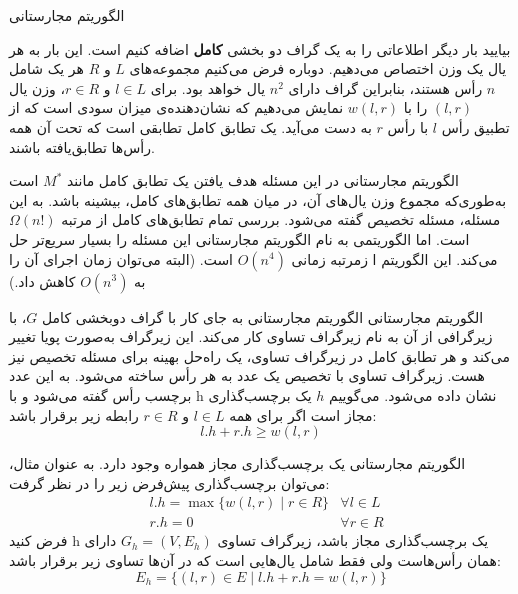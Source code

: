 \begin{itemframe}{الگوریتم مجارستانی}
\itm

بیایید بار دیگر اطلاعاتی را به یک گراف دو بخشی \textbf{کامل} اضافه کنیم است.
این بار به هر یال یک وزن اختصاص می‌دهیم.
دوباره فرض می‌کنیم مجموعه‌های $L$ و $R$ هر یک شامل $n$ رأس هستند، بنابراین گراف دارای
$n^2$
یال خواهد بود.
\itm
برای $l \in L$ و $r \in R$، وزن یال $(l, r)$ را با $w(l, r)$ نمایش می‌دهیم که نشان‌دهنده‌ی میزان سودی است که از تطبیق رأس $l$ با رأس $r$ به دست می‌آید.
\itm
یک تطابق کامل
 تطابقی است که تحت آن همه رأس‌ها تطابق‌یافته باشند.

\end{itemframe}


\begin{itemframe}{الگوریتم مجارستانی}
\itm
در این مسئله هدف یافتن یک تطابق کامل مانند
$M^*$
 است به‌طوری‌که مجموع وزن یال‌های آن، در میان همه تطابق‌های کامل، بیشینه باشد.
به این مسئله،‌ مسئله تخصیص
 گفته می‌شود.
\itm
بررسی تمام تطابق‌های کامل از مرتبه
$ \Omega (n!)$
است. اما الگوریتمی به نام الگوریتم مجارستانی
 این مسئله را بسیار سریع‌تر حل می‌کند.
\itm
این الگوریتم ا زمرتبه زمانی
$O(n^4)$
 است.
(البته می‌توان زمان اجرای آن را به
$O(n^3)$
 کاهش داد.)
\end{itemframe}


\begin{itemframe}{الگوریتم مجارستانی}
\itm
الگوریتم مجارستانی به جای کار با گراف دوبخشی کامل $G$، با زیرگرافی از آن به نام زیرگراف تساوی
کار می‌کند.
این زیرگراف به‌صورت پویا تغییر می‌کند و هر تطابق کامل در زیرگراف تساوی، یک راه‌حل بهینه برای مسئله تخصیص نیز هست.
\itm
زیرگراف تساوی با تخصیص یک عدد به هر رأس ساخته می‌شود. به این عدد برچسب رأس گفته می‌شود و با h نشان داده می‌شود.
\itm
می‌گوییم $h$ یک برچسب‌گذاری مجاز
است اگر برای همه $l \in L$ و $r \in R$ رابطه زیر برقرار باشد:
$$l.h + r.h \geq w(l, r)$$
\end{itemframe}


\begin{itemframe}{الگوریتم مجارستانی}
\itm
یک برچسب‌گذاری مجاز همواره وجود دارد. به عنوان مثال، می‌توان برچسب‌گذاری پیش‌فرض زیر را در نظر گرفت:
\begin{align*}
&l.h = \max \{ w(l, r) \mid r \in R \} &\forall l \in L\\
&r.h = 0 &\forall r \in R
\end{align*}
\itm
فرض کنید h یک برچسب‌گذاری مجاز باشد، زیرگراف تساوی $G_h = (V, E_h)$ دارای همان رأس‌هاست ولی فقط شامل یال‌هایی است که در آن‌ها تساوی زیر برقرار باشد:
$$
E_h = \{ (l, r) \in E \mid l.h + r.h = w(l, r) \}
$$
\end{itemframe}


